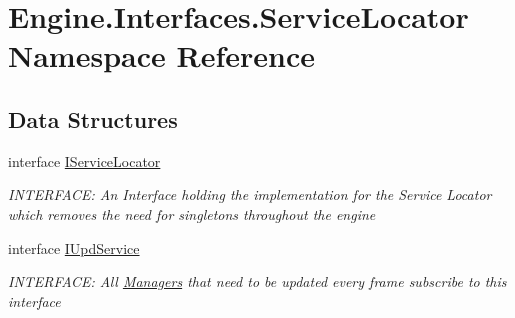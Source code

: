 \hypertarget{a00264}{}\section{Engine.\+Interfaces.\+Service\+Locator Namespace Reference}
\label{a00264}
\subsection*{Data Structures}
\begin{DoxyCompactItemize}
\item 
interface \hyperlink{a00474}{I\+Service\+Locator}
\begin{DoxyCompactList}\small\item\em I\+N\+T\+E\+R\+F\+A\+CE\+: An Interface holding the implementation for the Service Locator which removes the need for singletons throughout the engine \end{DoxyCompactList}\item 
interface \hyperlink{a00478}{I\+Upd\+Service}
\begin{DoxyCompactList}\small\item\em I\+N\+T\+E\+R\+F\+A\+CE\+: All \hyperlink{a00239}{Managers} that need to be updated every frame subscribe to this interface \end{DoxyCompactList}\end{DoxyCompactItemize}
